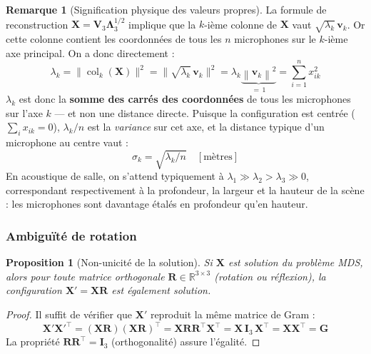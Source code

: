 \documentclass[12pt, a4paper]{article}
\theoremstyle{plain}
\newtheorem{proposition}[theorem]{Proposition}
\theoremstyle{definition}
\newtheorem{remark}[theorem]{Remarque}
\newcommand{\R}{\mathbb{R}}
\newcommand{\norm}[1]{\left\lVert #1 \right\rVert}
\newcommand{\mat}[1]{\mathbf{#1}}
\newcommand{\vect}[1]{\mathbf{#1}}
\newcommand{\Gram}{\mat{G}}
\begin{document}
\begin{remark}[Signification physique des valeurs propres]
    La formule de reconstruction $\mat{X} = \mat{V}_3\mat{\Lambda}_3^{1/2}$
    implique que la $k$-ième colonne de $\mat{X}$ vaut $\sqrt{\lambda_k}\,\vect{v}_k$.
    Or cette colonne contient les coordonnées de tous les $n$ microphones sur
    le $k$-ième axe principal. On a donc directement :
    \[
        \lambda_k
        = \bigl\lVert \operatorname{col}_k(\mat{X}) \bigr\rVert^2
        = \bigl\lVert \sqrt{\lambda_k}\,\vect{v}_k \bigr\rVert^2
        = \lambda_k \underbrace{\norm{\vect{v}_k}^2}_{=\,1}
        = \sum_{i=1}^{n} x_{ik}^2
    \]
    $\lambda_k$ est donc la \textbf{somme des carrés des coordonnées} de tous
    les microphones sur l'axe $k$ — et non une distance directe. Puisque la
    configuration est centrée ($\sum_i x_{ik} = 0$), $\lambda_k/n$ est la
    \emph{variance} sur cet axe, et la distance typique d'un microphone au
    centre vaut :
    \[
        \sigma_k = \sqrt{\lambda_k / n} \quad [\text{mètres}]
    \]
    En acoustique de salle, on s'attend typiquement à
    $\lambda_1 \gg \lambda_2 > \lambda_3 \gg 0$,
    correspondant respectivement à la profondeur, la largeur et la hauteur de
    la scène : les microphones sont davantage étalés en profondeur qu'en
    hauteur.
\end{remark}

\subsubsection{Ambiguïté de rotation}

\begin{proposition}[Non-unicité de la solution]\label{prop:rotation_ambiguity}
    Si $\mat{X}$ est solution du problème MDS, alors pour toute matrice
    orthogonale $\mat{R} \in \R^{3\times 3}$ (rotation ou réflexion), la
    configuration $\mat{X}' = \mat{X}\mat{R}$ est également solution.
\end{proposition}

\begin{proof}
    Il suffit de vérifier que $\mat{X}'$ reproduit la même matrice de Gram :
    \[
        \mat{X}'\mat{X}'^\top
        = (\mat{X}\mat{R})(\mat{X}\mat{R})^\top
        = \mat{X}\mat{R}\mat{R}^\top\mat{X}^\top
        = \mat{X}\,\mat{I}_3\,\mat{X}^\top
        = \mat{X}\mat{X}^\top = \Gram
    \]
    La propriété $\mat{R}\mat{R}^\top = \mat{I}_3$ (orthogonalité) assure
    l'égalité.
\end{proof}
\end{document}
